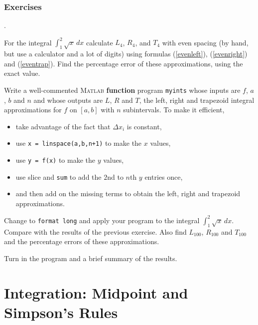 
\subsection*{Exercises}
\begin{list}
{.}{}

\item \label{exr:L4R4} For the integral $\int_1^2 \sqrt{x} \, dx$
  calculate $L_4$, $R_4$, and $T_4$ with even spacing (by hand, but
  use a calculator and a lot of digits) using formulas (\ref{evenleft}), (\ref{evenright})
  and (\ref{eventrap}).  Find the percentage error of these
  approximations, using the exact value.


\item Write a well-commented \textsc{Matlab} {\bf function} program
  \verb&myints& whose inputs are $f$, $a$, $b$ and $n$ and whose
  outputs are $L$, $R$ and $T$, the left, right and trapezoid integral
  approximations for $f$ on $[a,b]$ with $n$ subintervals. To make it
  efficient, 
  \begin{itemize}
  \item take advantage of the fact that $\Delta x_i$ is constant,
  \item use \verb&x = linspace(a,b,n+1)& to make the $x$ values,
  \item use \verb&y = f(x)& to make the $y$ values, 
  \item use slice and \verb&sum& to add the $2$nd to $n$th $y$ entries once,
  \item and then add on the missing
  terms to obtain the left, right and trapezoid approximations.  
  \end{itemize}
  Change to \verb&format long& and apply your program to the integral
  $\int_1^2 \sqrt{x} \, dx$. Compare with the results of the previous
  exercise. Also find $L_{100}$, $R_{100}$ and $T_{100}$ and the
  percentage errors of these approximations.

  Turn in the program and a brief summary of the results.
\end{list}


\chapter{Integration: Midpoint and Simpson's Rules}
\label{sec:MSrules}


